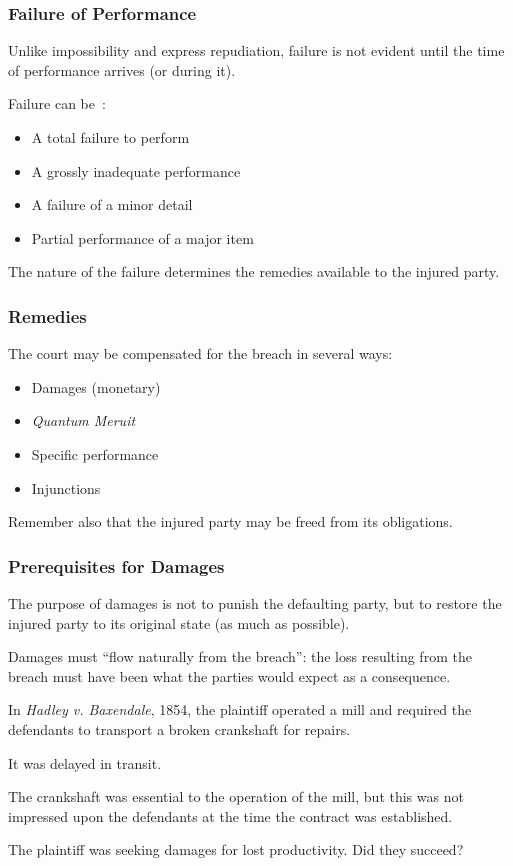 \begin{frame}
\frametitle{Failure of Performance}

Unlike impossibility and express repudiation, failure is not evident until the time of performance arrives (or during it).

Failure can be~\cite{lba}:

\begin{itemize}
	\item A total failure to perform
	\item A grossly inadequate performance
	\item A failure of a minor detail
	\item Partial performance of a major item
\end{itemize}

The nature of the failure determines the remedies available to the injured party.

\end{frame}



\begin{frame}
\frametitle{Remedies}

The court may be compensated for the breach in several ways:

\begin{itemize}
	\item Damages (monetary)
	\item \textit{Quantum Meruit} 
	\item Specific performance
	\item Injunctions
\end{itemize}

Remember also that the injured party may be freed from its obligations.

\end{frame}



\begin{frame}
\frametitle{Prerequisites for Damages}

The purpose of damages is not to punish the defaulting party, but to restore the injured party to its original state (as much as possible).

Damages must ``flow naturally from the breach'': the loss resulting from the breach must have been what the parties would expect as a consequence.


In \textit{Hadley v. Baxendale}, 1854, the plaintiff operated a mill and required the defendants to transport a broken crankshaft for repairs.

It was delayed in transit.

The crankshaft was essential to the operation of the mill, but this was not impressed upon the defendants at the time the contract was established.

The plaintiff was seeking damages for lost productivity. Did they succeed?

\end{frame}



